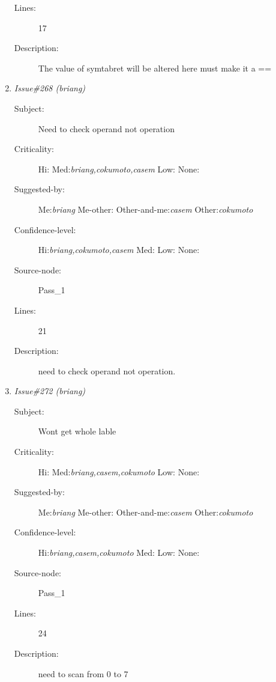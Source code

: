 \begin{enumerate}
\begin{description}
\item [Lines:] 17

\item [Description:] The value of symtabret will be altered here
must make it a ==
\end{description}
\item {\it Issue\#268 (briang)}
\begin{description}
\item [Subject:] Need to check operand not operation
\item [Criticality:] Hi:{\it } Med:{\it briang,cokumoto,casem} Low:{\it } None:{\it }
\item [Suggested-by:] Me:{\it briang} Me-other:{\it } Other-and-me:{\it casem} Other:{\it cokumoto}
\item [Confidence-level:] Hi:{\it briang,cokumoto,casem} Med:{\it } Low:{\it } None:{\it }
\item [Source-node:] Pass\_1

\item [Lines:] 21

\item [Description:] need to check operand not operation.
\end{description}
\item {\it Issue\#272 (briang)}
\begin{description}
\item [Subject:] Wont get whole lable
\item [Criticality:] Hi:{\it } Med:{\it briang,casem,cokumoto} Low:{\it } None:{\it }
\item [Suggested-by:] Me:{\it briang} Me-other:{\it } Other-and-me:{\it casem} Other:{\it cokumoto}
\item [Confidence-level:] Hi:{\it briang,casem,cokumoto} Med:{\it } Low:{\it } None:{\it }
\item [Source-node:] Pass\_1

\item [Lines:] 24

\item [Description:] need to scan from 0 to 7
\end{description}
\end{enumerate}
